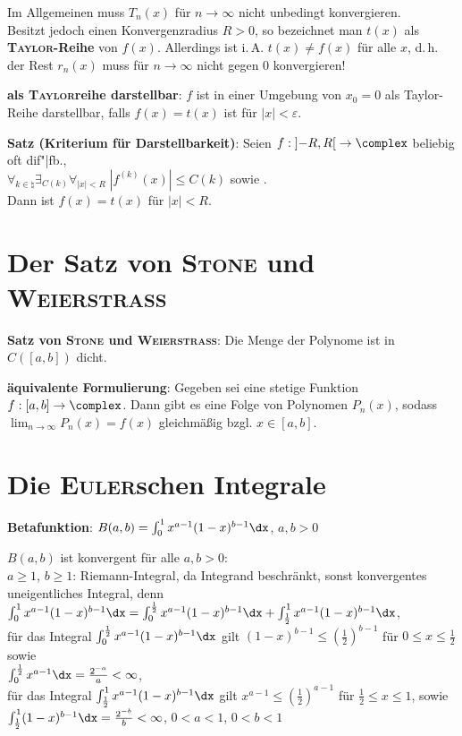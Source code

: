 Im Allgemeinen muss $T_n(x)$ für $n \to \infty$ nicht unbedingt
konvergieren. \\
Besitzt jedoch  einen Konvergenzradius $R > 0$,
so bezeichnet man $t(x)$ als \textbf{\textsc{Taylor}-Reihe} von $f(x)$.
Allerdings ist i.\,A. $t(x) \not= f(x)$ für alle $x$, d.\,h.
der Rest $r_n(x)$ muss für $n \to \infty$ nicht gegen $0$ konvergieren!

\textbf{als \textsc{Taylor}reihe darstellbar}:
$f$ ist in einer Umgebung von $x_0 = 0$ als Taylor-Reihe darstellbar,
falls $f(x) = t(x)$ ist für $|x| < \varepsilon$.

\textbf{Satz (Kriterium für Darstellbarkeit)}:
Seien $f: \left]-R,R\right[ \rightarrow \complex$ beliebig oft dif"|fb., \\
$\forall_{k \in \natural} \exists_{C(k)} \forall_{|x| < R}\;
|f^{(k)}(x)| \le C(k)$ sowie
. \\
Dann ist $f(x) = t(x)$ für $|x| < R$.

\section{%
    Der Satz von \textsc{Stone} und \textsc{Weierstrass}%
}

\textbf{Satz von \textsc{Stone} und \textsc{Weierstrass}}:
Die Menge der Polynome ist in $C([a,b])$ dicht.

\textbf{äquivalente Formulierung}:
Gegeben sei eine stetige Funktion $f: [a,b] \rightarrow \complex$.
Dann gibt es eine Folge von Polynomen $P_n(x)$, sodass
$\lim_{n \to \infty} P_n(x) = f(x)$ gleichmäßig bzgl. $x \in [a,b]$.

\section{%
    Die \textsc{Euler}schen Integrale%
}

\textbf{Betafunktion}:
$B(a, b) = \int_0^1 x^{a-1} (1 - x)^{b-1} \dx$, $a, b > 0$

$B(a, b)$ ist konvergent für alle $a, b > 0$: \\
$a \ge 1$, $b \ge 1$: Riemann-Integral, da Integrand beschränkt,
sonst konvergentes uneigentliches Integral, denn
$\int_0^1 x^{a-1} (1 - x)^{b-1} \dx =
\int_0^{\frac{1}{2}} x^{a-1} (1 - x)^{b-1} \dx +
\int_{\frac{1}{2}}^1 x^{a-1} (1 - x)^{b-1} \dx$, \\
für das Integral $\int_0^{\frac{1}{2}} x^{a-1} (1 - x)^{b-1} \dx$
gilt $(1 - x)^{b-1} \le \left(\frac{1}{2}\right)^{b-1}$ für
$0 \le x \le \frac{1}{2}$ sowie \\
$\int_0^{\frac{1}{2}} x^{a-1} \dx = \frac{2^{-a}}{a} < \infty$, \\
für das Integral $\int_{\frac{1}{2}}^1 x^{a-1} (1 - x)^{b-1} \dx$
gilt $x^{a-1} \le \left(\frac{1}{2}\right)^{a-1}$ für
$\frac{1}{2} \le x \le 1$, sowie \\
$\int_{\frac{1}{2}}^1 (1 - x)^{b-1} \dx =
\frac{2^{-b}}{b} < \infty$, $0 < a < 1$, $0 < b < 1$

